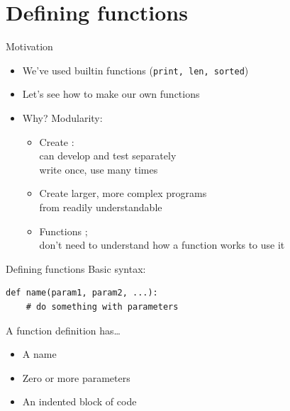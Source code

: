 \documentclass[aspectratio=169,usenames,dvipsnames]{beamer}
\begin{document}
\section{Defining functions}
\frame{\tableofcontents[currentsection]}

\begin{frame}{Motivation}
    \begin{itemize}
        \item We've used builtin functions (\lstinline{print, len, sorted})
        \item Let's see how to make our own functions
        \item Why? Modularity:
            \pause
            \begin{itemize}
                \item Create : \\
                    can develop and test separately \\
                    write once, use many times
                \item Create larger, more complex programs \\
                    from readily understandable 
                \item Functions ; \\
                    don't need to understand how a function works to use it
            \end{itemize}
    \end{itemize}
\end{frame}

\begin{frame}[fragile]{Defining functions}
Basic syntax:
\begin{lstlisting}
def name(param1, param2, ...):
    # do something with parameters
\end{lstlisting}

    A function definition has\dots
    \begin{itemize}
        \item A name
        \item Zero or more parameters
        \item An indented block of code
    \end{itemize}
\end{frame}
\end{document}
